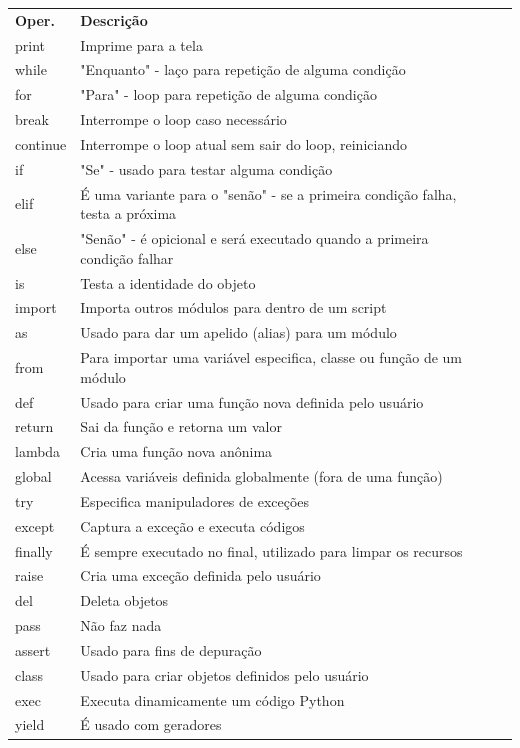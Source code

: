 \documentclass[landscape,a0paper,fontscale=0.285]{baposter} %
\begin{document}
\begin{poster}
{						\colorbox[HTML]{CCFFFF}{}
						\begin{tabular}{lp{5.8cm}lp{1.0cm}}
							{\bf Oper.} & {\bf Descrição}\\
							print & Imprime para a tela \\
							while & "Enquanto" - laço para repetição de alguma condição \\
							for & "Para" - loop para repetição de alguma condição \\
							break & Interrompe o loop caso necessário \\
							continue & Interrompe o loop atual sem sair do loop, reiniciando \\
							if & "Se" - usado para testar alguma condição \\
							elif & É uma variante para o "senão" - se a primeira condição falha, testa a próxima \\
							else & "Senão" - é opicional e será executado quando a primeira condição falhar \\
							is & Testa a identidade do objeto \\
							import & Importa outros módulos para dentro de um script \\
							as & Usado para dar um apelido (alias) para um módulo \\
							from & Para importar uma variável especifica, classe ou função de um módulo \\
							def & Usado para criar uma função nova definida pelo usuário \\
							return & Sai da função e retorna um valor \\
							lambda & Cria uma função nova anônima \\
							global & Acessa variáveis definida globalmente (fora de uma função) \\
							try & Especifica manipuladores de exceções  \\
							except & Captura a exceção e executa códigos \\
							finally & É sempre executado no final, utilizado para limpar os recursos \\
							raise & Cria uma exceção definida pelo usuário \\
							del & Deleta objetos \\
							pass & Não faz nada \\
							assert & Usado para fins de depuração \\
							class & Usado para criar objetos definidos pelo usuário \\
							exec & Executa dinamicamente um código Python \\
							yield & É usado com geradores
						\end{tabular}
						
}
\end{poster}
\end{document}
